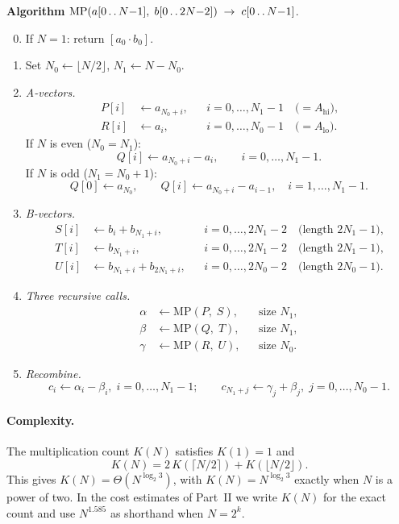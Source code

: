 \documentclass[11pt]{article}
\theoremstyle{plain}
\theoremstyle{remark}
\begin{document}
\medskip\noindent
\textbf{Algorithm} $\mathrm{MP}(a[0\mathinner{.\,.} N{-}1],\;
  b[0\mathinner{.\,.} 2N{-}2])
  \;\to\; c[0\mathinner{.\,.} N{-}1]$.

\begin{enumerate}
\setcounter{enumi}{-1}
\item If $N = 1$: return $[a_0 \cdot b_0]$.
\item Set $N_0 \gets \lfloor N/2 \rfloor$,\;
      $N_1 \gets N - N_0$.

\item \emph{A-vectors.}
\begin{align*}
P[i] &\gets a_{N_0+i}, && i = 0,\ldots,N_1{-}1
  \quad\text{($= A_{\mathrm{hi}}$),} \\
R[i] &\gets a_i, && i = 0,\ldots,N_0{-}1
  \quad\text{($= A_{\mathrm{lo}}$).}
\end{align*}
If $N$ is even ($N_0 = N_1$):
\[
Q[i] \gets a_{N_0+i} - a_i, \qquad i = 0,\ldots, N_1{-}1.
\]
If $N$ is odd ($N_1 = N_0 + 1$):
\[
Q[0] \gets a_{N_0},\qquad
Q[i] \gets a_{N_0+i} - a_{i-1},\quad i = 1,\ldots, N_1{-}1.
\]

\item \emph{B-vectors.}
\begin{align*}
S[i] &\gets b_i + b_{N_1+i},
  && i = 0,\ldots, 2N_1{-}2
  \quad\text{(length $2N_1{-}1$),}\\
T[i] &\gets b_{N_1+i},
  && i = 0,\ldots, 2N_1{-}2
  \quad\text{(length $2N_1{-}1$),}\\
U[i] &\gets b_{N_1+i} + b_{2N_1+i},
  && i = 0,\ldots, 2N_0{-}2
  \quad\text{(length $2N_0{-}1$).}
\end{align*}

\item \emph{Three recursive calls.}
\begin{align*}
\alpha &\gets \mathrm{MP}(P,\; S),
  &&\text{size } N_1, \\
\beta  &\gets \mathrm{MP}(Q,\; T),
  &&\text{size } N_1, \\
\gamma &\gets \mathrm{MP}(R,\; U),
  &&\text{size } N_0.
\end{align*}

\item \emph{Recombine.}
\[
c_i \gets \alpha_i - \beta_i,\; i = 0,\ldots,N_1{-}1;
\qquad
c_{N_1+j} \gets \gamma_j + \beta_j,\; j = 0,\ldots,N_0{-}1.
\]
\end{enumerate}

\paragraph{Complexity.}
The multiplication count $K(N)$ satisfies
$K(1) = 1$ and
\[
K(N) = 2\,K(\lceil N/2 \rceil) + K(\lfloor N/2 \rfloor).
\]
This gives $K(N) = \Theta(N^{\log_2 3})$,
with $K(N) = N^{\log_2 3}$ exactly when $N$ is a power of two.
In the cost estimates of Part~II we write $K(N)$
for the exact count
and use $N^{1.585}$ as shorthand when $N = 2^k$.
\end{document}
